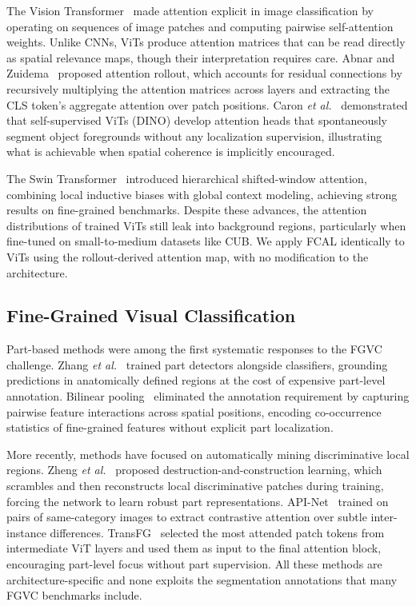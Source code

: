 \documentclass[journal]{IEEEtran}
\begin{document}
The Vision Transformer~\cite{dosovitskiy2020vit} made attention
explicit in image classification by operating on sequences of image
patches and computing pairwise self-attention weights. Unlike
CNNs, ViTs produce attention matrices that can be read directly as
spatial relevance maps, though their interpretation requires care.
Abnar and Zuidema~\cite{abnar2020quantifying} proposed attention
rollout, which accounts for residual connections by recursively
multiplying the attention matrices across layers and extracting
the CLS token's aggregate attention over patch positions. Caron
\emph{et al.}~\cite{caron2021emerging} demonstrated that
self-supervised ViTs (DINO) develop attention heads that
spontaneously segment object foregrounds without any localization
supervision, illustrating what is achievable when spatial
coherence is implicitly encouraged.

The Swin Transformer~\cite{liu2021swin} introduced hierarchical
shifted-window attention, combining local inductive biases with
global context modeling, achieving strong results on fine-grained
benchmarks. Despite these advances, the attention distributions
of trained ViTs still leak into background regions, particularly
when fine-tuned on small-to-medium datasets like CUB. We apply
FCAL identically to ViTs using the rollout-derived attention map,
with no modification to the architecture.

\subsection{Fine-Grained Visual Classification}

Part-based methods were among the first systematic responses to
the FGVC challenge. Zhang \emph{et al.}~\cite{zhang2014part}
trained part detectors alongside classifiers, grounding predictions
in anatomically defined regions at the cost of expensive part-level
annotation. Bilinear pooling~\cite{lin2015bilinear} eliminated the
annotation requirement by capturing pairwise feature interactions
across spatial positions, encoding co-occurrence statistics of
fine-grained features without explicit part localization.

More recently, methods have focused on automatically mining
discriminative local regions. Zheng \emph{et al.}~\cite{zheng2019looking}
proposed destruction-and-construction learning, which scrambles and
then reconstructs local discriminative patches during training,
forcing the network to learn robust part representations. API-Net~\cite{zhuang2020learning}
trained on pairs of same-category images to extract contrastive
attention over subtle inter-instance differences. TransFG~\cite{transfg2022}
selected the most attended patch tokens from intermediate ViT layers
and used them as input to the final attention block, encouraging
part-level focus without part supervision. All these methods are
architecture-specific and none exploits the segmentation annotations
that many FGVC benchmarks include.
\end{document}
